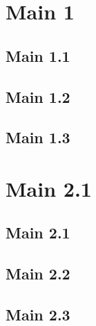 \documentclass[12pt,a4paper,titlepage,xcolor=dvipsnames,bibliography=totoc, listof=totoc]{scrartcl}
\theoremstyle{definition}
\begin{document}
\label{Begin Document}		%

\cleardoublepage
\renewcommand{\contentsname}{Table of Contents}
\tableofcontents
\newpage











\section{Main 1}
\subsection{Main 1.1}
\subsection{Main 1.2}
\subsection{Main 1.3}

\section{Main 2.1}
\subsection{Main 2.1}
\subsection{Main 2.2}
\subsection{Main 2.3}
\end{document}
